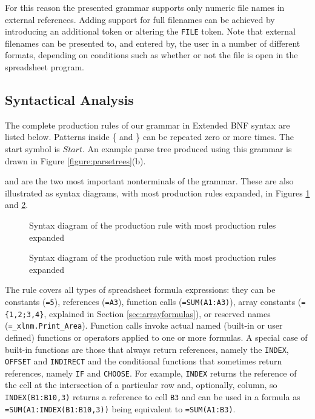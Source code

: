 \documentclass[times]{smrauth}
\begin{document}
For this reason the presented grammar supports only numeric file names in external references.
Adding support for full filenames can be achieved by introducing an additional token or altering the \texttt{FILE} token. Note that external filenames can be presented to, and entered by, the user in a number of different formats, depending on conditions such as whether or not the file is open in the spreadsheet program.

\subsection{Syntactical Analysis}
\label{subsection:productionRules}

The complete production rules of our grammar in Extended BNF syntax are listed below.
Patterns inside \{ and \} can be repeated zero or more times.
The start symbol is $Start$. An example parse tree produced using this grammar is drawn in Figure \ref{figure:parsetrees}(b).



 and  are the two most important nonterminals of the grammar.
These are also illustrated as syntax diagrams, with most production rules expanded, in Figures \ref{figure:Formula} and \ref{figure:Reference}.

\begin{figure}[]
	
	\caption{Syntax diagram of the  production rule with most production rules expanded}
	\label{figure:Formula}
\end{figure}

\begin{figure}[]
	\centering
	
	\caption{Syntax diagram of the  production rule with most production rules expanded}
	\label{figure:Reference}
\end{figure}

The  rule covers all types of spreadsheet formula expressions: they can be constants (\texttt{=5}), references (\texttt{=A3}), function calls (\texttt{=SUM(A1:A3)}), array constants (\texttt{=\{1,2;3,4\}}, explained in Section \ref{sec:arrayformulas}), or reserved names (\texttt{=_xlnm.Print_Area}). Function calls invoke actual named (built-in or user defined) functions or operators applied to one or more formulas. A special case of built-in functions are those that always return references, namely the \texttt{INDEX}, \texttt{OFFSET} and \texttt{INDIRECT} and the conditional functions that sometimes return references, namely \texttt{IF} and \texttt{CHOOSE}.
For example, \texttt{INDEX} returns the reference of the cell at the intersection of a particular row and, optionally, column, so \texttt{INDEX(B1:B10,3)} returns a reference to cell \texttt{B3} and can be used in a formula as \texttt{=SUM(A1:INDEX(B1:B10,3))} being equivalent to \texttt{=SUM(A1:B3)}.
\end{document}
